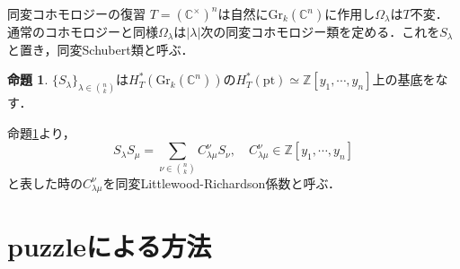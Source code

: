 \documentclass[unicode,12pt]{beamer}%
\theoremstyle{definition}
\newtheorem{prop}[defin]{命題}
\theoremstyle{example}
\newcommand{\integer}{\mathbb{Z}}
\newcommand{\complex}{\mathbb{C}}
\begin{document}
\begin{frame}{同変コホモロジーの復習}
  $T=(\complex^\times)^n$は自然に$\text{Gr}_k(\complex^n)$に作用し$\Omega_\lambda$は$T$不変．
  通常のコホモロジーと同様$\Omega_\lambda$は$|\lambda|$次の同変コホモロジー類を定める．これを$S_\lambda$と置き，同変Schubert類と呼ぶ．
  \begin{prop}\label{basis theorem}
    $\{S_\lambda\}_{\lambda\in\binom{n}{k}}$は$H^*_T(\text{Gr}_k(\complex^n))$の$H^*_T(\text{pt})\simeq\integer[y_1,\cdots,y_n]$上の基底をなす．
  \end{prop}
  命題\ref{basis theorem}より，
  \[
    S_\lambda S_\mu = \sum_{\nu\in\binom{n}{k}}C^\nu_{\lambda\mu}S_\nu,\quad C^\nu_{\lambda\mu}\in\integer[y_1,\cdots,y_n]
  \]
  と表した時の$C^\nu_{\lambda\mu}$を同変Littlewood-Richardson係数と呼ぶ．
\end{frame}

\section[]{puzzleによる方法}
\end{document}
